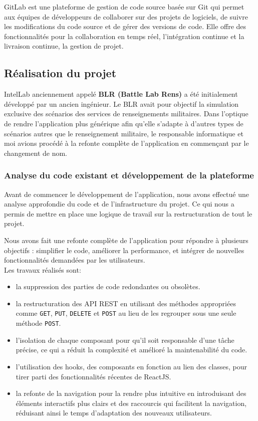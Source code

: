 GitLab est une plateforme de gestion de code source basée sur Git qui permet aux équipes de développeurs de collaborer sur des projets de logiciels, de suivre les modifications du code source et de gérer des versions de code.
Elle offre des fonctionnalités pour la collaboration en temps réel, l'intégration continue et la livraison continue, la gestion de projet.


\subsection{Réalisation du projet}
IntelLab anciennement appelé \textbf{BLR (Battle Lab Rens)} a été initialement développé par un ancien ingénieur. Le BLR avait pour objectif la simulation exclusive des scénarios des services de renseignements militaires.
Dans l’optique de rendre l’application plus générique afin qu’elle s’adapte à d’autres types de scénarios autres que le renseignement militaire, le responsable informatique et moi avions procédé à la refonte complète de l’application en commençant par le changement de nom.


\subsubsection{Analyse du code existant et développement de la plateforme}

Avant de commencer le développement de l’application, nous avons effectué une analyse approfondie du code et de l’infrastructure du projet.
Ce qui nous a permis de mettre en place une logique de travail sur la restructuration de tout le projet.

Nous avons fait une refonte complète de l'application pour répondre à plusieurs objectifs : simplifier le code, améliorer la performance, et intégrer de nouvelles fonctionnalités demandées par les utilisateurs.\\

\noindent Les travaux réalisés sont:

\begin{itemize}
	\item la suppression des parties de code redondantes ou obsolètes.
	\item la restructuration des API REST en utilisant des méthodes appropriées comme \texttt{GET}, \texttt{PUT}, \texttt{DELETE} et \texttt{POST} au lieu de les regrouper sous une seule méthode \texttt{POST}.
	\item l'isolation de chaque composant pour qu'il soit responsable d'une tâche précise, ce qui a réduit la complexité et amélioré la maintenabilité du code.
	\item l'utilisation des hooks, des composants en fonction au lien des classes, pour tirer parti des fonctionnalités récentes de ReactJS.
	\item la refonte de la navigation pour la rendre plus intuitive en introduisant des éléments interactifs plus clairs et des raccourcis qui facilitent la navigation, réduisant ainsi le temps d'adaptation des nouveaux utilisateurs.
\end{itemize}

